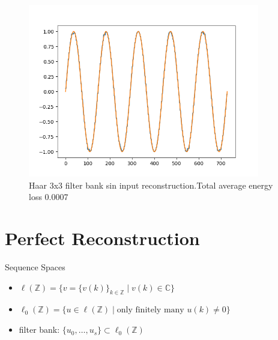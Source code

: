 \documentclass{beamer}
\begin{document}
\begin{frame}
\begin{itemize}
\begin{figure}[ht!]
\begin{minipage}{0.45\textwidth}
                      \includegraphics[width=0.9\textwidth]{fig/Haar3Augmented1D_sin_rec.png} %
                      \caption{Haar 3x3 filter bank sin input reconstruction.Total average energy loss 0.0007}
                  \end{minipage}
              \end{figure}
    \end{itemize}
\end{frame}

\section{Perfect Reconstruction}


\begin{frame}{Sequence Spaces}
    \begin{itemize}
        \item $\ell(\mathbb{Z})=\bigl\{v=\{v(k)\}_{k\in\mathbb{Z}}\mid v(k)\in\mathbb{C}\bigr\}$
        \item $\ell_0(\mathbb{Z})=\bigl\{u\in\ell(\mathbb{Z})\mid \text{only finitely many } u(k)\neq 0\bigr\}$
        \item filter bank: $\{u_0,\dots,u_s\}\subset \ell_0(\mathbb{Z})$
    \end{itemize}
\end{frame}
\end{document}
